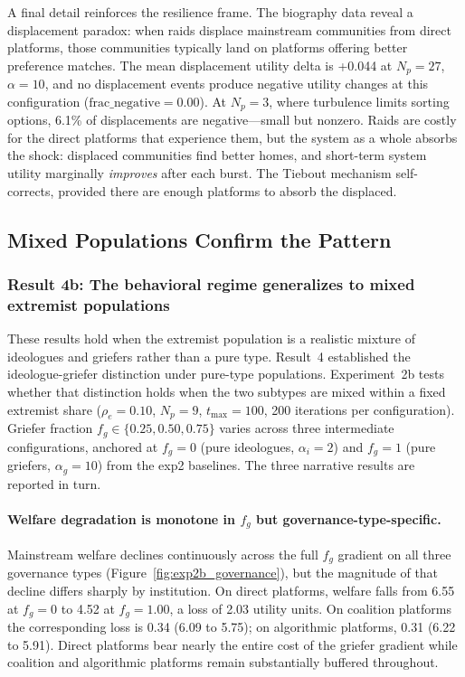 \documentclass{article}
\begin{document}
A final detail reinforces the resilience frame. The biography data reveal a displacement paradox: when raids displace mainstream communities from direct platforms, those communities typically land on platforms offering better preference matches. The mean displacement utility delta is +0.044 at $N_p = 27$, $\alpha = 10$, and no displacement events produce negative utility changes at this configuration ($\text{frac\_negative} = 0.00$). At $N_p = 3$, where turbulence limits sorting options, 6.1\% of displacements are negative---small but nonzero. Raids are costly for the direct platforms that experience them, but the system as a whole absorbs the shock: displaced communities find better homes, and short-term system utility marginally \textit{improves} after each burst. The Tiebout mechanism self-corrects, provided there are enough platforms to absorb the displaced.

\subsection{Mixed Populations Confirm the Pattern}
\label{sec:results_mixed}

\subsubsection{Result 4b: The behavioral regime generalizes to mixed extremist populations}

These results hold when the extremist population is a realistic mixture of ideologues and griefers rather than a pure type. Result~4 established the ideologue-griefer distinction under pure-type populations. Experiment~2b tests whether that distinction holds when the two subtypes are mixed within a fixed extremist share ($\rho_e = 0.10$, $N_p = 9$, $t_{\max} = 100$, 200 iterations per configuration). Griefer fraction $f_g \in \{0.25, 0.50, 0.75\}$ varies across three intermediate configurations, anchored at $f_g = 0$ (pure ideologues, $\alpha_i = 2$) and $f_g = 1$ (pure griefers, $\alpha_g = 10$) from the exp2 baselines. The three narrative results are reported in turn.

\paragraph{Welfare degradation is monotone in $f_g$ but governance-type-specific.}
Mainstream welfare declines continuously across the full $f_g$ gradient on all three governance types (Figure~\ref{fig:exp2b_governance}), but the magnitude of that decline differs sharply by institution. On direct platforms, welfare falls from 6.55 at $f_g = 0$ to 4.52 at $f_g = 1.00$, a loss of 2.03 utility units. On coalition platforms the corresponding loss is 0.34 (6.09 to 5.75); on algorithmic platforms, 0.31 (6.22 to 5.91). Direct platforms bear nearly the entire cost of the griefer gradient while coalition and algorithmic platforms remain substantially buffered throughout.
\end{document}
